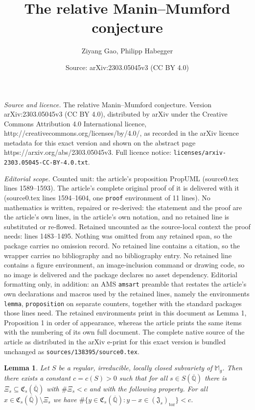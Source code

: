 \documentclass[10pt,a4paper]{amsart}
\title{The relative Manin--Mumford conjecture}
\author{Ziyang Gao, Philipp Habegger}
\date{Source: arXiv:2303.05045v3 (CC BY 4.0)}
\newtheorem{lemma}{Lemma}
\newcommand{\IQbar}{{\overline{\QQ}}}
\def\QQ{\mathbb{Q}}
\newcommand{\ssm}{\setminus}
\renewcommand{\subset}{\subseteq} %
\begin{document}
\maketitle

\noindent\emph{Source and licence.} The relative Manin--Mumford conjecture. Version arXiv:2303.05045v3 (CC BY 4.0), distributed by arXiv under the Creative Commons Attribution 4.0 International licence, http://creativecommons.org/licenses/by/4.0/, as recorded in the arXiv licence metadata for this exact version and shown on the abstract page https://arxiv.org/abs/2303.05045v3. Full licence notice: \texttt{licenses/arxiv-2303.05045-CC-BY-4.0.txt}.\par\smallskip

\noindent\textit{Editorial scope.} Counted unit: the article's proposition PropUML (source0.tex lines 1589--1593). The article's complete original proof of it is delivered with it (source0.tex lines 1594--1604, one \texttt{proof} environment of 11 lines). No mathematics is written, repaired or re-derived: the statement and the proof are the article's own lines, in the article's own notation, and no retained line is substituted or re-flowed.  Retained uncounted as the source-local context the proof needs: lines 1483--1495.  Nothing was omitted from any retained span, so the package carries no omission record.  No retained line contains a citation, so the wrapper carries no bibliography and no bibliography entry.  No retained line contains a figure environment, an image-inclusion command or drawing code, so no image is delivered and the package declares no asset dependency.  Editorial formatting only, in addition: an AMS \texttt{amsart} preamble that restates the article's own declarations and macros used by the retained lines, namely the environments \texttt{lemma}, \texttt{proposition} on separate counters, together with the standard packages those lines need.  The retained environments print in this document as Lemma 1, Proposition 1 in order of appearance, whereas the article prints the same items with the numbering of its own full document.  The complete native source of the article as distributed in the arXiv e-print for this exact version is bundled unchanged as \texttt{sources/138395/source0.tex}.
\begin{lemma}\label{LemUML}
  Let $S$ be a regular, irreducible, locally closed subvariety of
  $\mathbb{M}_g$. Then there exists a constant $c = c(S) > 0$ such that
  for all $s\in S(\IQbar)$ there is $\Xi_s\subset
  \mathfrak{C}_s(\IQbar)$ with $\#\Xi_s < c$ and with the following
  property.
  For all $x\in \mathfrak{C}_s(\IQbar)\ssm \Xi_s$ we have
    $\#\{y \in \mathfrak{C}_s(\IQbar) : y-x \in (\mathfrak{J}_s)_{\mathrm{tor}} \} < c$.
\end{lemma}
\end{document}
